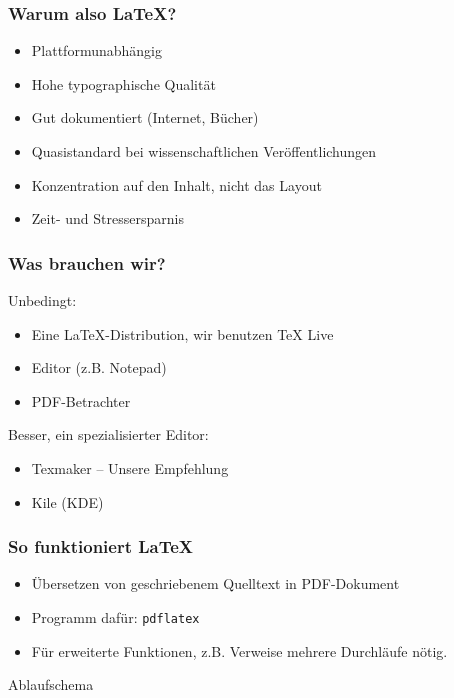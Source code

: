 \begin{frame}
    \frametitle{Warum also \LaTeX?{}}
    \begin{itemize}
        \item Plattformunabhängig\pause
        \item Hohe typographische Qualität\pause
        \item Gut dokumentiert (Internet, Bücher)\pause
        \item Quasistandard bei wissenschaftlichen Veröffentlichungen\pause
        \item Konzentration auf den Inhalt, nicht das Layout\pause
        \item Zeit- und Stressersparnis
    \end{itemize}
\end{frame}

\begin{frame}
    \frametitle{Was brauchen wir?}
    Unbedingt:
    \begin{itemize}
        \item Eine \LaTeX{}-Distribution, wir benutzen TeX Live\pause
        \item Editor (z.B. Notepad)\pause
        \item PDF-Betrachter
    \end{itemize}
    \pause
    \bigskip
    Besser, ein spezialisierter Editor:
    \begin{itemize}
        \item Texmaker -- Unsere Empfehlung
        \item Kile (KDE)
    \end{itemize}
\end{frame}

\begin{frame}
    \frametitle{So funktioniert \LaTeX{}}
    \begin{itemize}
        \item Übersetzen von geschriebenem Quelltext in PDF-Dokument
        \item Programm dafür: \texttt{pdflatex}
        \item Für erweiterte Funktionen, z.B. Verweise mehrere Durchläufe nötig.
    \end{itemize}
    \pause\bigskip
    \begin{block}{Ablaufschema}\centering
    \end{block}
\end{frame}
